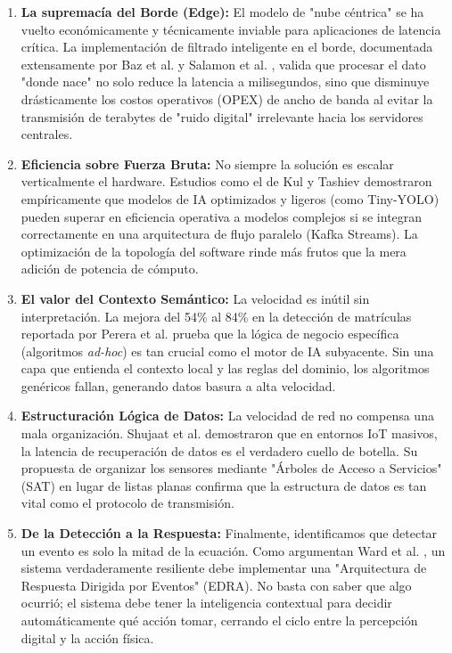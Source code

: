 \begin{enumerate}
    \item \textbf{La supremacía del Borde (Edge):} El modelo de "nube céntrica" se ha vuelto económicamente y técnicamente inviable para aplicaciones de latencia crítica. La implementación de filtrado inteligente en el borde, documentada extensamente por Baz et al. \cite{baz2019video} y Salamon et al. \cite{salamon2018gateway}, valida que procesar el dato "donde nace" no solo reduce la latencia a milisegundos, sino que disminuye drásticamente los costos operativos (OPEX) de ancho de banda al evitar la transmisión de terabytes de "ruido digital" irrelevante hacia los servidores centrales.
    
    \item \textbf{Eficiencia sobre Fuerza Bruta:} No siempre la solución es escalar verticalmente el hardware. Estudios como el de Kul y Tashiev \cite{kul2021microservices} demostraron empíricamente que modelos de IA optimizados y ligeros (como Tiny-YOLO) pueden superar en eficiencia operativa a modelos complejos si se integran correctamente en una arquitectura de flujo paralelo (Kafka Streams). La optimización de la topología del software rinde más frutos que la mera adición de potencia de cómputo.
    
    \item \textbf{El valor del Contexto Semántico:} La velocidad es inútil sin interpretación. La mejora del 54\% al 84\% en la detección de matrículas reportada por Perera et al. \cite{perera2024traffic} prueba que la lógica de negocio específica (algoritmos \textit{ad-hoc}) es tan crucial como el motor de IA subyacente. Sin una capa que entienda el contexto local y las reglas del dominio, los algoritmos genéricos fallan, generando datos basura a alta velocidad.
    
    \item \textbf{Estructuración Lógica de Datos:} La velocidad de red no compensa una mala organización. Shujaat et al. \cite{shujaat2021improvements} demostraron que en entornos IoT masivos, la latencia de recuperación de datos es el verdadero cuello de botella. Su propuesta de organizar los sensores mediante "Árboles de Acceso a Servicios" (SAT) en lugar de listas planas confirma que la estructura de datos es tan vital como el protocolo de transmisión.
    
    \item \textbf{De la Detección a la Respuesta:} Finalmente, identificamos que detectar un evento es solo la mitad de la ecuación. Como argumentan Ward et al. \cite{ward2005response}, un sistema verdaderamente resiliente debe implementar una "Arquitectura de Respuesta Dirigida por Eventos" (EDRA). No basta con saber que algo ocurrió; el sistema debe tener la inteligencia contextual para decidir automáticamente qué acción tomar, cerrando el ciclo entre la percepción digital y la acción física.
\end{enumerate}

